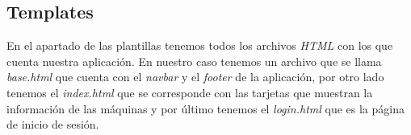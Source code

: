 \subsection{Templates}

En el apartado de las plantillas tenemos todos los archivos \textit{HTML} con los que cuenta nuestra aplicación. En nuestro caso tenemos un archivo que se llama \textit{base.html} que cuenta con el \textit{navbar} y el \textit{footer} de la aplicación, por otro lado tenemos el \textit{index.html} que se corresponde con las tarjetas que muestran la información de las máquinas y por último tenemos el \textit{login.html} que es la página de inicio de sesión.



